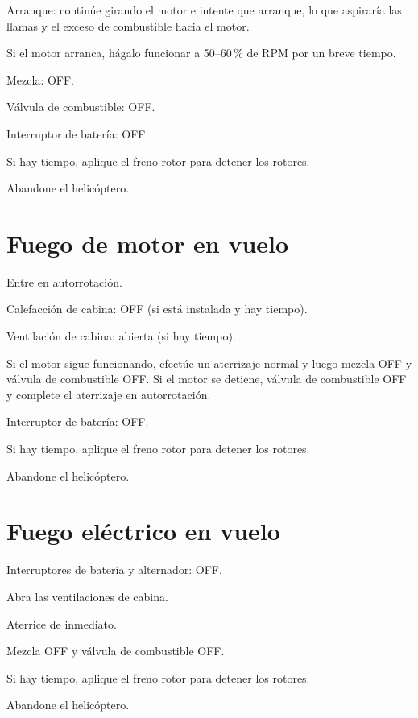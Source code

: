 \begin{pasos}
\item Arranque: continúe girando el motor e intente que arranque, lo que aspiraría las llamas y el exceso de combustible hacia el motor.
\item Si el motor arranca, hágalo funcionar a 50--60\,\% de RPM por un breve tiempo.
\item Mezcla: OFF.
\item Válvula de combustible: OFF.
\item Interruptor de batería: OFF.
\item Si hay tiempo, aplique el freno rotor para detener los rotores.
\item Abandone el helicóptero.
\end{pasos}

\section{Fuego de motor en vuelo}

\begin{pasos}
\item Entre en autorrotación.
\item Calefacción de cabina: OFF (si está instalada y hay tiempo).
\item Ventilación de cabina: abierta (si hay tiempo).
\item Si el motor sigue funcionando, efectúe un aterrizaje normal y luego mezcla OFF y válvula de combustible OFF. Si el motor se detiene, válvula de combustible OFF y complete el aterrizaje en autorrotación.
\item Interruptor de batería: OFF.
\item Si hay tiempo, aplique el freno rotor para detener los rotores.
\item Abandone el helicóptero.
\end{pasos}

\section{Fuego eléctrico en vuelo}

\begin{pasos}
\item Interruptores de batería y alternador: OFF.
\item Abra las ventilaciones de cabina.
\item Aterrice de inmediato.
\item Mezcla OFF y válvula de combustible OFF.
\item Si hay tiempo, aplique el freno rotor para detener los rotores.
\item Abandone el helicóptero.
\end{pasos}

